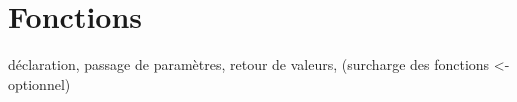 \chapter{Fonctions}
\label{chapFonctions}
déclaration, passage de paramètres, retour de valeurs, (surcharge des fonctions <- optionnel)